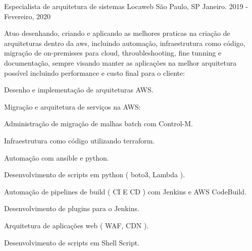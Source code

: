 \begin{cventries}
  \cventry
    {Especialista de arquitetura de sistemas} %
    {Locaweb} %
    {São Paulo, SP} %
    {Janeiro. 2019 - Fevereiro, 2020} %
    {
      \begin{cvitems} %
       \item {Atuo desenhando, criando e aplicando as melhores praticas na criação de arquiteturas dentro da aws, incluindo automação, infraestrutura como código, migração de on-premisses para cloud, throubleshooting, fine tunning e documentação, sempre visando manter as aplicações na melhor arquitetura possível incluindo performance e custo final para o cliente:}
       \item {Desenho e implementação de arquiteturas AWS.}
       \item {Migração e arquitetura de serviços na AWS:}
       \item {}
       \item {}
       \item {}
       \item {}
       \item {}
       \item {}
       \item {Administração de migração de malhas batch com Control-M.}
       \item {Infraestrutura como código utilizando terraform.}
       \item {Automação com ansible e python.}
       \item {Desenvolvimento de scripts em python ( boto3, Lambda ).}
       \item {Automação de pipelines de build ( CI E CD ) com Jenkins e AWS CodeBuild.}
       \item {Desenvolvimento de plugins para o Jenkins.}
       \item {}
       \item {}
       \item {Arquitetura de aplicações web ( WAF, CDN ).}
       \item {Desenvolvimento de scripts em Shell Script.}
      \end{cvitems}
    }


\end{cventries}
